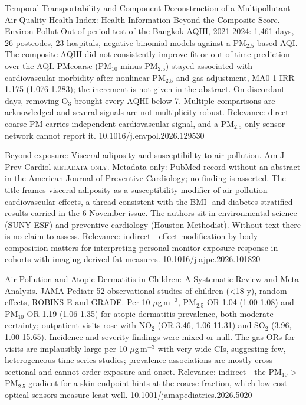 \documentclass[10pt]{article}
\begin{document}
{Temporal Transportability and Component Deconstruction of a Multipollutant Air Quality Health Index: Health Information Beyond the Composite Score.}
{Environ Pollut}
{Out-of-period test of the Bangkok AQHI, 2021-2024: 1,461 days, 26 postcodes, 23 hospitals, negative binomial models against a PM$_{2.5}$-based AQI. The composite AQHI did not consistently improve fit or out-of-time prediction over the AQI. PMcoarse (PM$_{10}$ minus PM$_{2.5}$) stayed associated with cardiovascular morbidity after nonlinear PM$_{2.5}$ and gas adjustment, MA0-1 IRR 1.175 (1.076-1.283); the increment is not given in the abstract. On discordant days, removing O$_3$ brought every AQHI below 7. Multiple comparisons are acknowledged and several signals are not multiplicity-robust. Relevance: direct - coarse PM carries independent cardiovascular signal, and a PM$_{2.5}$-only sensor network cannot report it.}
{10.1016/j.envpol.2026.129530}

{Beyond exposure: Visceral adiposity and susceptibility to air pollution.}
{Am J Prev Cardiol}
{\textsc{metadata only.} Metadata only: PubMed record without an abstract in the American Journal of Preventive Cardiology; no finding is asserted. The title frames visceral adiposity as a susceptibility modifier of air-pollution cardiovascular effects, a thread consistent with the BMI- and diabetes-stratified results carried in the 6 November issue. The authors sit in environmental science (SUNY ESF) and preventive cardiology (Houston Methodist). Without text there is no claim to assess. Relevance: indirect - effect modification by body composition matters for interpreting personal-monitor exposure-response in cohorts with imaging-derived fat measures.}
{10.1016/j.ajpc.2026.101820}

\par{}\baselineskip{}\baselineskip
{}

{Air Pollution and Atopic Dermatitis in Children: A Systematic Review and Meta-Analysis.}
{JAMA Pediatr}
{52 observational studies of children (<18 y), random effects, ROBINS-E and GRADE. Per 10 $\mu$g\,m$^{-3}$, PM$_{2.5}$ OR 1.04 (1.00-1.08) and PM$_{10}$ OR 1.19 (1.06-1.35) for atopic dermatitis prevalence, both moderate certainty; outpatient visits rose with NO$_2$ (OR 3.46, 1.06-11.31) and SO$_2$ (3.96, 1.00-15.65). Incidence and severity findings were mixed or null. The gas ORs for visits are implausibly large per 10 $\mu$g\,m$^{-3}$ with very wide CIs, suggesting few, heterogeneous time-series studies; prevalence associations are mostly cross-sectional and cannot order exposure and onset. Relevance: indirect - the PM$_{10}$ > PM$_{2.5}$ gradient for a skin endpoint hints at the coarse fraction, which low-cost optical sensors measure least well.}
{10.1001/jamapediatrics.2026.5020}
\end{document}
